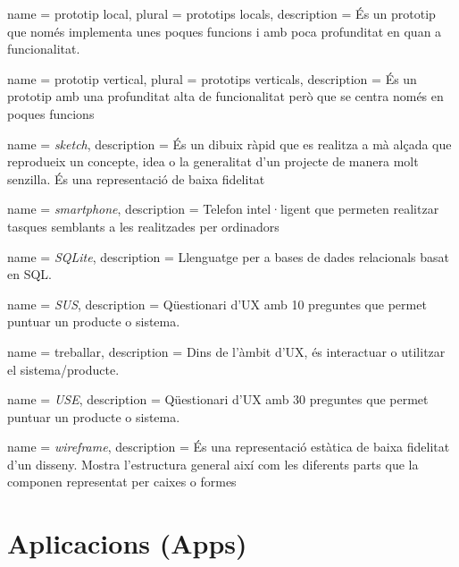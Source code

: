 {
name = prototip local, plural = prototips locals, description = {És un prototip que només implementa unes poques funcions i amb poca profunditat en quan a funcionalitat.}
}

{
name = prototip vertical, plural = prototips verticals, description = {És un prototip amb una profunditat alta de funcionalitat però que se centra només en poques funcions}
}

{
name = \textit{sketch}, description = {És un dibuix ràpid que es realitza a mà alçada que reprodueix un concepte, idea o la generalitat d'un projecte de manera molt senzilla. És una representació de baixa fidelitat} 
}

{
name = \textit{smartphone}, description = {Telefon intel·ligent que permeten realitzar tasques semblants a les realitzades per ordinadors} 
}

{
name = \textit{SQLite}, description = {Llenguatge per a bases de dades relacionals basat en SQL.} 
}

{
name = \textit{SUS}, description = {Qüestionari d'UX amb 10 preguntes que permet puntuar un producte o sistema.} 
}

{
name = treballar, description = {Dins de l'àmbit d'UX, és interactuar o utilitzar el sistema/producte.} 
}

{
name = \textit{USE}, description = {Qüestionari d'UX amb 30 preguntes que permet puntuar un producte o sistema.} 
}

{
name = \textit{wireframe}, description = {És una representació estàtica de baixa fidelitat d'un disseny. Mostra l'estructura general així com les diferents parts que la componen representat per caixes o formes}
}



\printglossary[title = Glossari]


\chapter*{Aplicacions (Apps)}
\label{sec:apps}

